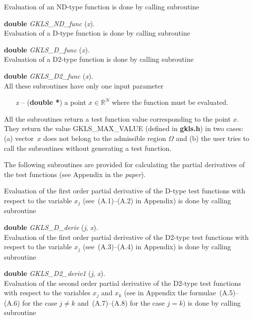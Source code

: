 \documentclass[acmtoms]{acmtrans2m}
\begin{document}
Evaluation of an ND-type function is done by calling subroutine

{\bf double} {\it GKLS\_ND\_func} ({\it x}).\\
Evaluation of a D-type function is done by calling subroutine

{\bf double} {\it GKLS\_D\_func} ({\it x}).\\
Evaluation of a D2-type function is done by calling subroutine

{\bf double} {\it GKLS\_D2\_func} ({\it x}).\\
All these subroutines have only one input parameter
\begin{itemize}
 \item[\it x] -- ({\bf double *}) a point $x \in \mathbb{R} ^N$
 where the function must be evaluated.
\end{itemize}
All the subroutines return a test function value corresponding to
the point $x$. They return the value GKLS\_MAX\_VALUE (defined in
{\bf gkls.h}) in two cases: (a) vector~$x$ does not belong to the
admissible region $\Omega$ and (b) the user tries to call the
subroutines without generating a test function.

The following subroutines are provided for calculating the partial
derivatives of the test functions (see Appendix in the {\it
paper}).

Evaluation of the first order partial derivative of the D-type
test functions with respect to the variable $x_j$
(see~(A.1)--(A.2) in Appendix) is done by calling subroutine

{\bf double} {\it GKLS\_D\_deriv} ({\it j}, {\it x}). \\
Evaluation of the first order partial derivative of the D2-type
test functions with respect to the variable $x_j$
(see~(A.3)--(A.4) in Appendix) is done by calling subroutine

{\bf double} {\it GKLS\_D2\_deriv1} ({\it j}, {\it x}). \\
Evaluation of the second order partial derivative of the D2-type
test functions with respect to the variables $x_j$ and $x_k$ (see
in Appendix the formulae~(A.5)--(A.6) for the case $j \neq k$
and~(A.7)--(A.8) for the case $j = k$) is done by calling
subroutine
\end{document}

